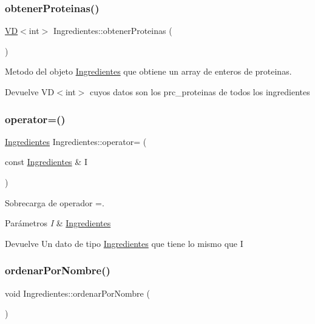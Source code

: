 \subsubsection{\texorpdfstring{obtener\+Proteinas()}{obtenerProteinas()}}
{\footnotesize\ttfamily \hyperlink{classVD}{VD}$<$int$>$ Ingredientes\+::obtener\+Proteinas (\begin{DoxyParamCaption}{ }\end{DoxyParamCaption})}



Metodo del objeto \hyperlink{classIngredientes}{Ingredientes} que obtiene un array de enteros de proteinas. 

\begin{DoxyReturn}{Devuelve}
V\+D$<$int$>$ cuyos datos son los prc\+\_\+proteinas de todos los ingredientes 
\end{DoxyReturn}
\mbox{\label{classIngredientes_a62ad2bb49e19ce82df5d04fe94081e9c}} 
\subsubsection{\texorpdfstring{operator=()}{operator=()}}
{\footnotesize\ttfamily \hyperlink{classIngredientes}{Ingredientes} Ingredientes\+::operator= (\begin{DoxyParamCaption}\item[{const \hyperlink{classIngredientes}{Ingredientes} \&}]{I }\end{DoxyParamCaption})}



Sobrecarga de operador =. 


\begin{DoxyParams}{Parámetros}
{\em I} & \hyperlink{classIngredientes}{Ingredientes} \\
\hline
\end{DoxyParams}
\begin{DoxyReturn}{Devuelve}
Un dato de tipo \hyperlink{classIngredientes}{Ingredientes} que tiene lo mismo que I 
\end{DoxyReturn}
\mbox{\label{classIngredientes_a6cd27f6353a430fae6db51695dac95b5}} 
\subsubsection{\texorpdfstring{ordenar\+Por\+Nombre()}{ordenarPorNombre()}}
{\footnotesize\ttfamily void Ingredientes\+::ordenar\+Por\+Nombre (\begin{DoxyParamCaption}{ }\end{DoxyParamCaption})}



